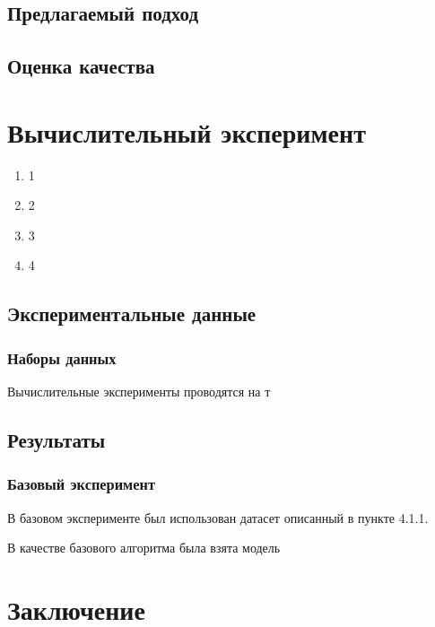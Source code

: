 \documentclass[12pt]{article}
\begin{document}
\subsection{Предлагаемый подход}

\subsection{Оценка качества}




\newpage
\section{Вычислительный эксперимент}
\begin{enumerate}
    \item 1
    \item 2
    \item 3
    \item 4
\end{enumerate}

\subsection{Экспериментальные данные}
\subsubsection{Наборы данных}
Вычислительные эксперименты проводятся на т

\subsection{Результаты}
\subsubsection{Базовый эксперимент}

В базовом эксперименте был использован датасет описанный в пункте 4.1.1.


В качестве базового алгоритма была взята модель 




\newpage
\section*{Заключение}


\newpage
{}


\end{document}
